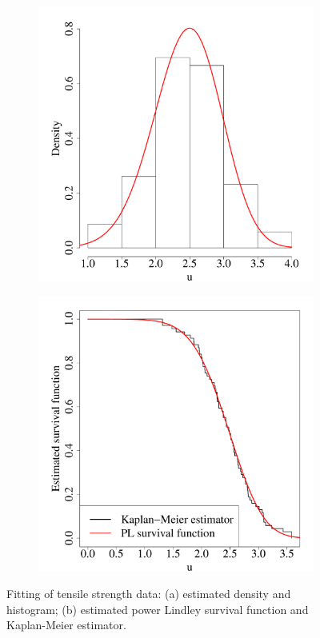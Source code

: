 \documentclass[nojss]{jss}
\begin{document}
\begin{figure}[H]
\centering
    \begin{subfigure}[h]{0.49\textwidth}
        \includegraphics[width=\textwidth]{article-PLexample_a}
        \caption{\label{fig:density}}
    \end{subfigure}
    \begin{subfigure}[h]{0.49\textwidth}
        \includegraphics[width=\textwidth]{article-PLexample_b}
        \caption{\label{fig:survival}}
    \end{subfigure}
\caption{\label{fig:PL} Fitting of tensile strength data: (a) estimated density and histogram; (b) estimated power Lindley survival function and Kaplan-Meier estimator.}
\end{figure}
\end{document}
